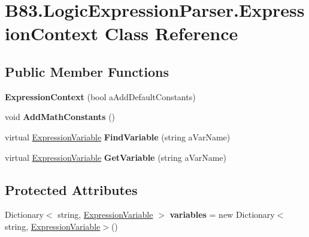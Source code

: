 \hypertarget{class_b83_1_1_logic_expression_parser_1_1_expression_context}{}\section{B83.\+Logic\+Expression\+Parser.\+Expression\+Context Class Reference}
\label{class_b83_1_1_logic_expression_parser_1_1_expression_context}
\subsection*{Public Member Functions}
\begin{DoxyCompactItemize}
\item 
{\bfseries Expression\+Context} (bool a\+Add\+Default\+Constants)\hypertarget{class_b83_1_1_logic_expression_parser_1_1_expression_context_a87b31cf1e3bb8dfa521c27c1e2dfdd8a}{}\label{class_b83_1_1_logic_expression_parser_1_1_expression_context_a87b31cf1e3bb8dfa521c27c1e2dfdd8a}

\item 
void {\bfseries Add\+Math\+Constants} ()\hypertarget{class_b83_1_1_logic_expression_parser_1_1_expression_context_ae81739af37301a8855a899d13fd36345}{}\label{class_b83_1_1_logic_expression_parser_1_1_expression_context_ae81739af37301a8855a899d13fd36345}

\item 
virtual \hyperlink{class_b83_1_1_logic_expression_parser_1_1_expression_variable}{Expression\+Variable} {\bfseries Find\+Variable} (string a\+Var\+Name)\hypertarget{class_b83_1_1_logic_expression_parser_1_1_expression_context_a27a1c6d266599d39cf05d5ae30192d1e}{}\label{class_b83_1_1_logic_expression_parser_1_1_expression_context_a27a1c6d266599d39cf05d5ae30192d1e}

\item 
virtual \hyperlink{class_b83_1_1_logic_expression_parser_1_1_expression_variable}{Expression\+Variable} {\bfseries Get\+Variable} (string a\+Var\+Name)\hypertarget{class_b83_1_1_logic_expression_parser_1_1_expression_context_a5ca887a576d0f4471f42c125294ac56f}{}\label{class_b83_1_1_logic_expression_parser_1_1_expression_context_a5ca887a576d0f4471f42c125294ac56f}

\end{DoxyCompactItemize}
\subsection*{Protected Attributes}
\begin{DoxyCompactItemize}
\item 
Dictionary$<$ string, \hyperlink{class_b83_1_1_logic_expression_parser_1_1_expression_variable}{Expression\+Variable} $>$ {\bfseries variables} = new Dictionary$<$string, \hyperlink{class_b83_1_1_logic_expression_parser_1_1_expression_variable}{Expression\+Variable}$>$()\hypertarget{class_b83_1_1_logic_expression_parser_1_1_expression_context_a647e64f0cff08b7e158f0d53e652a18f}{}\label{class_b83_1_1_logic_expression_parser_1_1_expression_context_a647e64f0cff08b7e158f0d53e652a18f}

\end{DoxyCompactItemize}
